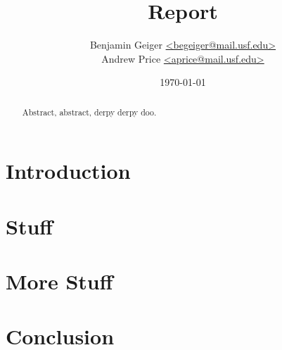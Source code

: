 \documentclass{article}
\title{Report}
\author{Benjamin Geiger \url{<begeiger@mail.usf.edu>}\\
Andrew Price \url{<aprice@mail.usf.edu>}}
\date{\today}
\begin{document}
\maketitle

\begin{abstract}
Abstract, abstract, derpy derpy doo.
\end{abstract}

\section{Introduction}

\section{Stuff}

\section{More Stuff}

\section{Conclusion}

\nocite{*}


\end{document}
